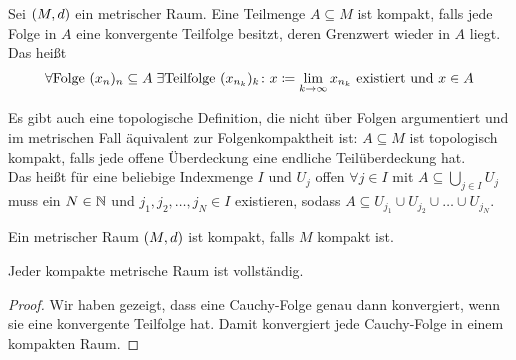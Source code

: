 \thispagestyle{pagenumberonly}

\begin{definition}[Kompaktheit]
    Sei $\left(M, d\right)$ ein metrischer Raum. Eine Teilmenge $A\subseteq M$ ist kompakt, falls jede Folge in $A$ eine konvergente Teilfolge besitzt, deren Grenzwert wieder in $A$ liegt. Das heißt
    \begin{align*}
        \forall \text{Folge } (x_n)_n\subseteq A\;\exists\text{Teilfolge } (x_{n_k})_k\colon x\coloneqq \lim_{k\rightarrow{}\infty} x_{n_k}\text{ existiert und }x\in A
    \end{align*}
\end{definition}

\begin{bemerkung}
    Es gibt auch eine topologische Definition, die nicht über Folgen argumentiert und im metrischen Fall äquivalent zur Folgenkompaktheit ist: $A\subseteq M$ ist topologisch kompakt, falls jede offene Überdeckung eine endliche Teilüberdeckung hat.\\
    Das heißt für eine beliebige Indexmenge $I$ und $U_j$ offen $\forall j\in I$ mit $A\subseteq \bigcup_{j\in I} U_j$ muss ein $N\in\mathbb{N}$ und $j_1, j_2, \ldots, j_N \in I$ existieren, sodass $A \subseteq U_{j_1} \cup U_{j_2} \cup \dots \cup U_{j_N}$.
\end{bemerkung}

\begin{definition}
    Ein metrischer Raum $\left(M, d\right)$ ist kompakt, falls $M$ kompakt ist.
\end{definition}

\begin{bemerkung}
    Jeder kompakte metrische Raum ist vollständig.
    \begin{proof}
        Wir haben gezeigt, dass eine Cauchy-Folge genau dann konvergiert, wenn sie eine konvergente Teilfolge hat. Damit konvergiert jede Cauchy-Folge in einem kompakten Raum.
    \end{proof}
\end{bemerkung}


